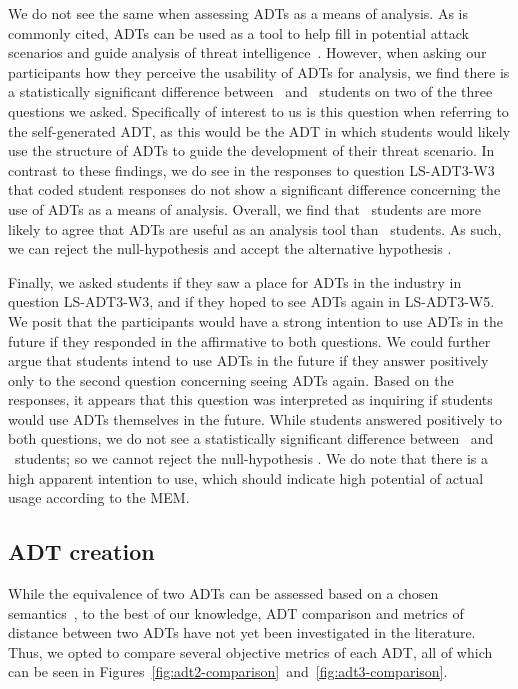 We do not see the same when assessing ADTs as a means of analysis. As is commonly cited, ADTs can be used as a tool to help fill in potential attack scenarios and guide analysis of threat intelligence~\cite{andersonSecurityEngineeringGuide2020,schneierSecretsLiesDigital2000}. However, when asking our participants how they perceive the usability of ADTs for analysis, we find there is a statistically significant difference between \ICS\ and \SEC\ students on two of the three questions we asked. Specifically of interest to us is this question when referring to the self-generated ADT, as this would be the ADT in which students would likely use the structure of ADTs to guide the development of their threat scenario. In contrast to these findings, we do see in the responses to question LS-ADT3-W3 that coded student responses do not show a significant difference concerning the use of ADTs as a means of analysis. 
Overall, we find that \ICS\ students are more likely to agree that ADTs are useful as an analysis tool than \SEC\ students. As such, we can reject the null-hypothesis \nullhypothesis{\hypoAnalysisTool} and accept the alternative hypothesis \althypothesis{\hypoAnalysisTool}.

Finally, we asked students if they saw a place for ADTs in the industry in question LS-ADT3-W3, and if they hoped to see ADTs again in LS-ADT3-W5. We posit that the participants would have a strong intention to use ADTs in the future if they responded in the affirmative to both questions. We could further argue that students intend to use ADTs in the future if they answer positively only to the second question concerning seeing ADTs again. Based on the responses, it appears that this question was interpreted as inquiring if students would use ADTs themselves in the future. While students answered positively to both questions, we do not see a statistically significant difference between \ICS\ and \SEC\ students; so we cannot reject  the null-hypothesis \nullhypothesis{\hypoIntentionToUse}. We do note that there is a high apparent intention to use, which should indicate high potential of actual usage according to the MEM.


\subsection{ADT creation}
\label{ssec:analysis-adt-creation}

While the equivalence of two ADTs can be assessed based on a chosen semantics~\cite{mauwFoundationsAttackTrees2006}, to the best of our knowledge, ADT comparison and metrics of distance between two ADTs have not yet been investigated in the literature. Thus, we opted to compare several objective metrics of each ADT, all of which can be seen in Figures~\ref{fig:adt2-comparison}~and~\ref{fig:adt3-comparison}. 

